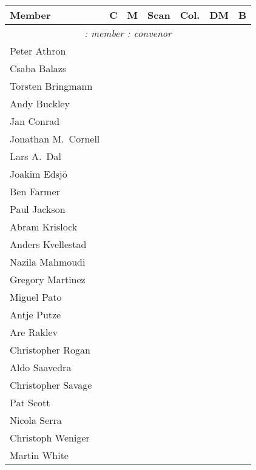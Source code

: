\begin{center}
\renewcommand{\arraystretch}{1.25}
\begin{tabular*}{0.99\textwidth}{@{\extracolsep{\fill}}|lcccccc|}
  \hline
  \textbf{Member} & \textbf{C}    & \textbf{M}   
                  & \textbf{Scan} & \textbf{Col.} 
                  & \textbf{DM}   & \textbf{B} \\
  \hline
  \multicolumn{7}{|c|}{\textit{\M{}: member \hspace{3em} \C{}: convenor}}\\
  Peter Athron          & \M&\C &    &    &    &    \\
  Csaba Balazs          & \C&\M &    & \M &    &    \\
  Torsten Bringmann     &   &\M &    &    & \C &    \\
  Andy Buckley          &   &   &    & \M &    &    \\
  Jan Conrad            &   &   &    &    & \M &    \\
  Jonathan M.\ Cornell  &   &\M &    &    & \M &    \\
  Lars A.\ Dal          & \M&   &    &    & \M &    \\
  Joakim Edsj\"o        &   &   &    &    & \M &    \\
  Ben Farmer            & \M&\C & \M & \M &    &    \\
  Paul Jackson          &   &   &    & \M &    & \M \\
  Abram Krislock        &   &   & \M & \C &    &    \\
  Anders Kvellestad     & \M&\M &    & \M &    &    \\
  Nazila Mahmoudi       &   &   &    & \M &    & \C \\
  Gregory Martinez      & \M&   & \C &    &    &    \\
  Miguel Pato           &   &   &    &    & \M &    \\
  Antje Putze           & \M&   & \M &    & \M &    \\
  Are Raklev            &   &\M &    & \M &    &    \\
  Christopher Rogan     &   &\M &    & \M &    &    \\
  Aldo Saavedra         & \M&\M &    & \M &    &    \\
  Christopher Savage    &   &   & \M &    & \C &    \\
  Pat Scott             & \C&\M & \M & \M & \M &    \\
  Nicola Serra          &   &   &    & \M &    & \M \\
  Christoph Weniger     & \M&\M & \M &    & \C &    \\
  Martin White          &   &\M &    & \C &    &    \\
  \hline
\end{tabular*}
\end{center}


